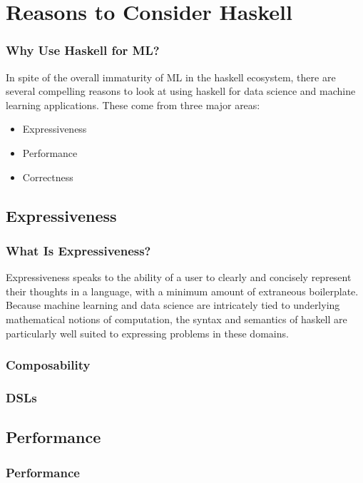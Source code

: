 \documentclass{beamer}
\begin{document}
\section{Reasons to Consider Haskell}

\begin{frame}
  \frametitle{Why Use Haskell for ML?}
  In spite of the overall immaturity of ML in the haskell ecosystem, there are several compelling reasons to look at using haskell for data science and machine learning applications.  These come from three major areas:
  \begin{itemize}
    \item Expressiveness
    \item Performance
    \item Correctness
  \end{itemize}
\end{frame}

\subsection{Expressiveness}

\begin{frame}
  \frametitle{What Is Expressiveness?}
  Expressiveness speaks to the ability of a user to clearly and
  concisely represent their thoughts in a language, with a minimum
  amount of extraneous boilerplate.  Because machine learning and data
  science are intricately tied to underlying mathematical notions of
  computation, the syntax and semantics of haskell are particularly
  well suited to expressing problems in these domains.
\end{frame}

\begin{frame}
  \frametitle{Composability}

\end{frame}

\begin{frame}
  \frametitle{DSLs}

\end{frame}

\subsection{Performance}

\begin{frame}
  \frametitle{Performance}

\end{frame}
\end{document}
